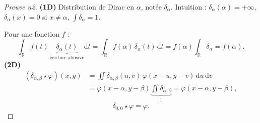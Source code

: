 \begin{proof}[Preuve n2]
  \textbf{(1D)} Distribution de Dirac en $\alpha$, notée $\delta_\alpha$.
  Intuition : $\delta_\alpha(\alpha)=+\infty$, $\delta_\alpha(x)=0$ si $x\neq\alpha$, $\int\delta_\alpha=1$.
  \begin{figure}[!h]\centering
    
  \end{figure}
  Pour une fonction $f$ :
  \[
    \int_{\mathbb{R}}f(t)\,\underbrace{\delta_\alpha(t)}_{\text{écriture abusive}}\mathrm{d}t
    =\int_{\mathbb{R}}f(\alpha)\,\delta_\alpha(t)\,\mathrm{d}t
    =f(\alpha)\int_{\mathbb{R}}\delta_\alpha=f(\alpha).
  \]
  \textbf{(2D)}
  \begin{align*}
    (\delta_{\alpha,\beta}\star\varphi)(x,y)&=\iint\delta_{\alpha,\beta}(u,v)\,\varphi(x-u,y-v)\,\mathrm{d}u\,\mathrm{d}v\\
    &=\varphi(x-\alpha,y-\beta)\underbrace{\iint\delta_{\alpha,\beta}}_{1}=\varphi(x-\alpha,y-\beta),
  \end{align*}
  \[
    \delta_{0,0}\star\varphi=\varphi.
  \]
 

\end{proof}
